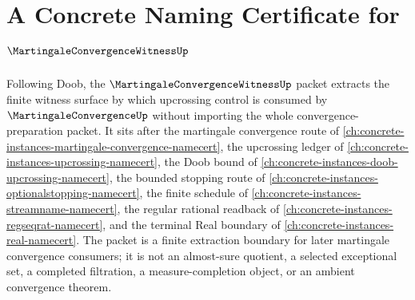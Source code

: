 \chapter{A Concrete Naming Certificate for $\MartingaleConvergenceWitnessUp$}
\label{ch:concrete-instances-martingale-convergence-witness-namecert}

Following Doob, the $\MartingaleConvergenceWitnessUp$ packet extracts the finite witness surface by which upcrossing control is consumed by $\MartingaleConvergenceUp$ without importing the whole convergence-preparation packet. It sits after the martingale convergence route of \autoref{ch:concrete-instances-martingale-convergence-namecert}, the upcrossing ledger of \autoref{ch:concrete-instances-upcrossing-namecert}, the Doob bound of \autoref{ch:concrete-instances-doob-upcrossing-namecert}, the bounded stopping route of \autoref{ch:concrete-instances-optionalstopping-namecert}, the finite schedule of \autoref{ch:concrete-instances-streamname-namecert}, the regular rational readback of \autoref{ch:concrete-instances-regseqrat-namecert}, and the terminal Real boundary of \autoref{ch:concrete-instances-real-namecert}. The packet is a finite extraction boundary for later martingale convergence consumers; it is not an almost-sure quotient, a selected exceptional set, a completed filtration, a measure-completion object, or an ambient convergence theorem.

